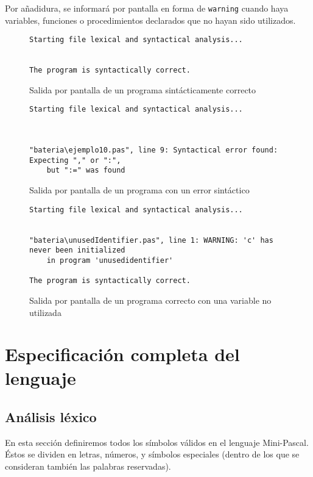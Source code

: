 \documentclass[a4paper,oneside]{report}
\begin{document}
Por añadidura, se informará por pantalla en forma de \texttt{warning} cuando haya variables, funciones o procedimientos declarados que no hayan sido utilizados.

\begin{figure}[h]
\begin{verbatim}
Starting file lexical and syntactical analysis...


The program is syntactically correct.
\end{verbatim}
\caption{Salida por pantalla de un programa sintácticamente correcto}
\label{fig:correct}
\end{figure}



\begin{figure}[h]
\begin{verbatim}
Starting file lexical and syntactical analysis...



"bateria\ejemplo10.pas", line 9: Syntactical error found: Expecting "," or ":",
	but ":=" was found
\end{verbatim}
\caption{Salida por pantalla de un programa con un error sintáctico}
\label{fig:error}
\end{figure}



\begin{figure}[h]
\begin{verbatim}
Starting file lexical and syntactical analysis...


"bateria\unusedIdentifier.pas", line 1: WARNING: 'c' has never been initialized
	in program 'unusedidentifier'

The program is syntactically correct.
\end{verbatim}
\caption{Salida por pantalla de un programa correcto con una variable no utilizada}
\label{fig:warning}
\end{figure}

\chapter{Especificación completa del lenguaje}

\section{Análisis léxico}

En esta sección definiremos todos los símbolos válidos en el lenguaje Mini-Pascal. Éstos se dividen en letras, números, y símbolos especiales (dentro de los que se consideran también las palabras reservadas).
\end{document}

